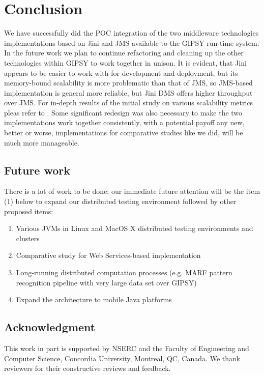 \documentclass{easychair}
\newcommand{\jini}{{Jini\index{Jini}}}
\newcommand{\jms}{{JMS\index{JMS}}}
\begin{document}
\section{Conclusion}
\label{sect:conclusion}

We have successfully did the POC integration of the
two middleware technologies implementations based
on {\jini} and {\jms} available to the GIPSY run-time
system. In the future work we plan to continue
refactoring and cleaning up the other technologies
within GIPSY to work together in unison.
It is evident, that Jini appears to be easier to work with for
development and deployment, but its memory-bound scalability is
more problematic than that of JMS, so JMS-based implementation is
general more reliable, but Jini DMS offers higher throughput
over JMS.
For in-depth results of the initial study on various
scalability metrics pleas refer to \cite{ji-yi-mcthesis-2011}.
Some significant redesign was also necessary to make the two
implementations work together consistently, with a potential
payoff any new, better or worse, implementations for comparative
studies like we did, will be much more manageable.

\subsection{Future work}

There is a lot of work to be done; our immediate future attention will be
the item (1) below to expand our distributed testing environment followed
by other proposed items:

\begin{enumerate}
	\item Various JVMs in Linux and MacOS X distributed testing environments and clusters
	\item Comparative study for Web Services-based implementation
	\item Long-running distributed computation processes (e.g. MARF pattern recognition pipeline with very large data set over GIPSY)
	\item Expand the architecture to mobile Java platforms
\end{enumerate}


\subsection{Acknowledgment}

This work in part is supported by NSERC and the Faculty of Engineering and
Computer Science, Concordia University, Montreal, QC, Canada.
We thank reviewers for their constructive reviews and feedback.
\end{document}
